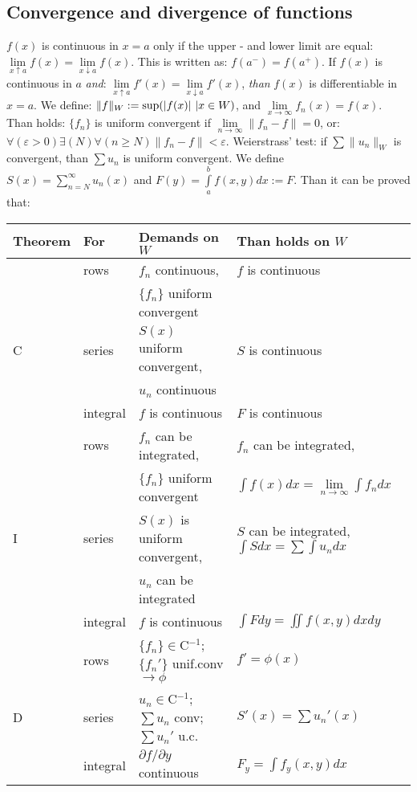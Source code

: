 \subsection{Convergence and divergence of functions}
\label{sec:convf}
$f(x)$ is continuous in $x=a$ only if the upper - and lower limit are equal:
$\lim\limits_{x\uparrow a}f(x)=\lim\limits_{x\downarrow a}f(x)$.
This is written as: $f(a^-)=f(a^+)$.
\npar
If $f(x)$ is continuous in $a$ {\it and}:
$\lim\limits_{x\uparrow a}f'(x)=\lim\limits_{x\downarrow a}f'(x)$,
{\it than} $f(x)$ is differentiable in $x=a$.
\npar
We define: $\|f\|_W:={\rm sup}(|f(x)|~|x\in W)$, and $\lim\limits_{x\rightarrow\infty}f_n(x)=f(x)$.
Than holds: $\{f_n\}$ is uniform convergent if $\lim\limits_{n\rightarrow\infty}\|f_n-f\|=0$,
or: $\forall(\varepsilon>0)\exists(N)\forall(n\geq N)\|f_n-f\|<\varepsilon$.
\npar
Weierstrass' test: if $\sum\|u_n\|_W$ is convergent, than $\sum u_n$ is
uniform convergent.
\npar
We define $\displaystyle S(x)=\sum_{n=N}^\infty u_n(x)$ and
$\displaystyle F(y)=\int\limits_a^bf(x,y)dx:=F$. Than it can be proved that:
\begin{center}
\begin{tabular}{||l|l|p{5cm}|p{6cm}||}
\hline
\bf Theorem&\bf For&\bf Demands on $W$&\bf Than holds on $W$\\
\hline
\hline
 &rows    &$f_n$ continuous,                           &$f$ is continuous\\
 &        &$\{f_n\}$ uniform convergent                &\\
\cline{2-4}
C&series  &$S(x)$ uniform convergent,                  &$S$ is continuous\\
 &        &$u_n$ continuous                            &\\
\cline{2-4}
 &integral&$f$ is continuous                           &$F$ is continuous\\
\hline
 &rows    &$f_n$ can be integrated,                    &$f_n$ can be integrated,\\
 &        &$\{f_n\}$ uniform convergent                &$\int f(x)dx=\lim\limits_{n\rightarrow\infty}\int f_ndx$\rule[-10pt]{0pt}{0pt}\\
\cline{2-4}
I&series  &$S(x)$ is uniform convergent,               &$S$ can be integrated, $\int Sdx=\sum\int u_ndx$\rule{0pt}{13pt}\\
 &        &$u_n$ can be integrated                     &\\
\cline{2-4}
 &integral&$f$ is continuous                           &$\int Fdy=\iint f(x,y)dxdy$\rule{0pt}{13pt}\rule[-8pt]{0pt}{0pt}\\
\hline
 &rows    &$\{f_n\}\in$C$^{-1}$; $\{f_n'\}$ unif.conv $\rightarrow\phi$&$f'=\phi(x)$\rule{0pt}{13pt}\rule[-7pt]{0pt}{0pt}\\
\cline{2-4}
D&series  &$u_n\in$C$^{-1}$; $\sum u_n$ conv; $\sum u_n'$ u.c.&$S'(x)=\sum u_n'(x)$\rule{0pt}{13pt}\rule[-7pt]{0pt}{0pt}\\
\cline{2-4}
 &integral&$\partial f/\partial y$ continuous          &$F_y=\int f_y(x,y)dx$\rule{0pt}{13pt}\rule[-7pt]{0pt}{0pt}\\
\hline
\end{tabular}
\end{center}


